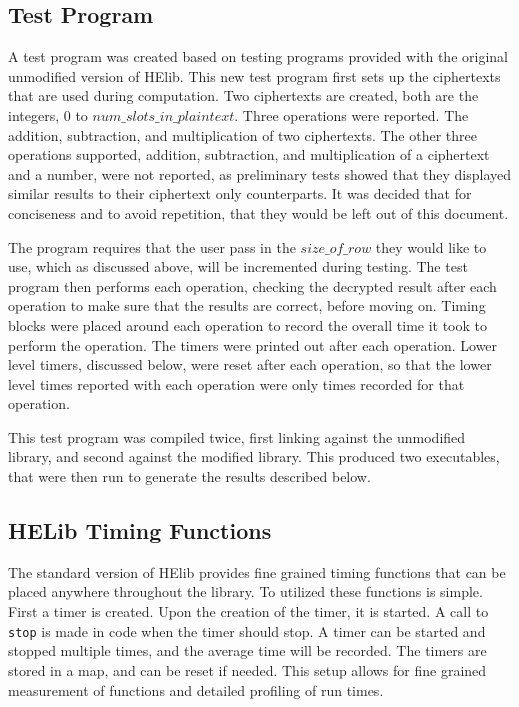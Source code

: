 \subsection{Test Program}
A test program was created based on testing programs provided with the original unmodified version of HElib. This new test program first sets up the ciphertexts that are used during computation. Two ciphertexts are created, both are the integers, $0$ to $ num\_slots\_in\_plaintext$. Three operations were reported. The addition, subtraction, and multiplication of two ciphertexts. The other three operations supported, addition, subtraction, and multiplication of a ciphertext and a number, were not reported, as preliminary tests showed that they displayed similar results to their ciphertext only counterparts. It was decided that for conciseness and to avoid repetition, that they would be left out of this document.

The program requires that the user pass in the $size\_of\_row$ they would like to use, which as discussed above, will be incremented during testing. The test program then performs each operation, checking the decrypted result after each operation to make sure that the results are correct, before moving on. Timing blocks were placed around each operation to record the overall time it took to perform the operation. The timers were printed out after each operation. Lower level timers, discussed below, were reset after each operation, so that the lower level times reported with each operation were only times recorded for that operation.

This test program was compiled twice, first linking against the unmodified library, and second against the modified library. This produced two executables, that were then run to generate the results described below.

\subsection{HELib Timing Functions}
The standard version of HElib provides fine grained timing functions that can be placed anywhere throughout the library. To utilized these functions is simple. First a timer is created. Upon the creation of the timer, it is started. A call to \verb|stop| is made in code when the timer should stop. A timer can be started and stopped multiple times, and the average time will be recorded. The timers are stored in a map, and can be reset if needed. This setup allows for fine grained measurement of functions and detailed profiling of run times. 

